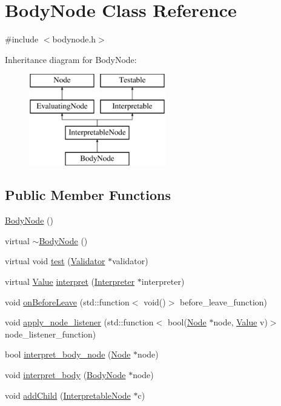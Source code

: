 \hypertarget{classBodyNode}{}\section{Body\+Node Class Reference}
\label{classBodyNode}


{\ttfamily \#include $<$bodynode.\+h$>$}

Inheritance diagram for Body\+Node\+:\begin{figure}[H]
\begin{center}
\leavevmode
\includegraphics[height=4.000000cm]{classBodyNode}
\end{center}
\end{figure}
\subsection*{Public Member Functions}
\begin{DoxyCompactItemize}
\item 
\hyperlink{classBodyNode_ac431b406e16e66745f5413eb868f23b8}{Body\+Node} ()
\item 
virtual \hyperlink{classBodyNode_acf86c2f7982224510b39a5f35de0bbde}{$\sim$\+Body\+Node} ()
\item 
virtual void \hyperlink{classBodyNode_a80e75b0ab6c388c34a82bdce63fdc7bb}{test} (\hyperlink{classValidator}{Validator} $\ast$validator)
\item 
virtual \hyperlink{classValue}{Value} \hyperlink{classBodyNode_a5ab94984d059dba1f7d2baa6022712ba}{interpret} (\hyperlink{classInterpreter}{Interpreter} $\ast$interpreter)
\item 
void \hyperlink{classBodyNode_a8b27949f189186af47dd81336d0d5ce7}{on\+Before\+Leave} (std\+::function$<$ void()$>$ before\+\_\+leave\+\_\+function)
\item 
void \hyperlink{classBodyNode_adf1536979d1a57a735cc75290117afa4}{apply\+\_\+node\+\_\+listener} (std\+::function$<$ bool(\hyperlink{classNode}{Node} $\ast$node, \hyperlink{classValue}{Value} v)$>$ node\+\_\+listener\+\_\+function)
\item 
bool \hyperlink{classBodyNode_a7019e16f431cbf8975b1fde622d47d77}{interpret\+\_\+body\+\_\+node} (\hyperlink{classNode}{Node} $\ast$node)
\item 
void \hyperlink{classBodyNode_a9b6bafc8338e35a034aff1a23d519b1e}{interpret\+\_\+body} (\hyperlink{classBodyNode}{Body\+Node} $\ast$node)
\item 
void \hyperlink{classBodyNode_ab8a99f9e2c7d33f7cf4cbb07a61bec0f}{add\+Child} (\hyperlink{classInterpretableNode}{Interpretable\+Node} $\ast$c)
\end{DoxyCompactItemize}
